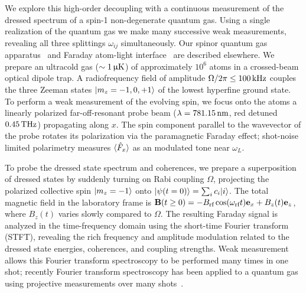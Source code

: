 \documentclass[aps,prl,reprint,superscriptaddress,floatfix]{revtex4-1}
\begin{document}
We explore this high-order decoupling with a continuous measurement of the dressed spectrum of a spin-1 non-degenerate quantum gas.
Using a single realization of the quantum gas we make many successive weak measurements, revealing all three splittings $\omega_{ij}$ simultaneously.
Our spinor quantum gas apparatus~\cite{wood_magnetic_2015} and Faraday atom-light interface~\cite{jasperse_magic-wavelength_2017} are described elsewhere.
We prepare an ultracold gas ($\sim \unit[1]{\upmu K}$) of approximately $10^6$ \Rb atoms in a crossed-beam optical dipole trap.
A radiofrequency field of amplitude $\Omega/2\pi \leq \unit[100]{kHz}$ couples the three Zeeman states $\vert m_z=-1,0,+1 \rangle $ of the lowest hyperfine ground state.
To perform a weak measurement of the evolving spin, we focus onto the atoms a linearly polarized far-off-resonant probe beam ($\lambda=\unit[781.15]{nm}$, red detuned $\unit[0.45]{THz}$) propagating along $x$.
The spin component parallel to the wavevector of the probe rotates its polarization via the paramagnetic Faraday effect; shot-noise limited polarimetry measures $\langle \hat{F}_x \rangle$ as an modulated tone near $\omega_L$.

To probe the dressed state spectrum and coherences, we prepare a superposition of dressed states by suddenly turning on Rabi coupling $\Omega$, projecting the polarized collective spin $\vert m_z=-1 \rangle $ onto $\vert \psi(t=0) \rangle  = \sum_i c_i \vert i \rangle $.
The total magnetic field in the laboratory frame is $\mathbf{B}(t \geq 0) = -B_{\text{rf}} \cos (\omega_{\text{rf}} t) \mathbf{e}_x + B_z(t) \mathbf{e}_z$, where $B_z(t)$ varies slowly compared to $\Omega$.
The resulting Faraday signal is analyzed in the time-frequency domain using the short-time Fourier transform (STFT), revealing the rich frequency and amplitude modulation related to the dressed state energies, coherences, and coupling strengths.
Weak measurement allows this Fourier transform spectroscopy to be performed many times in one shot; recently Fourier transform spectroscopy has been applied to a quantum gas using projective measurements over many shots~\cite{valdes-curiel_fourier_2017}.
\end{document}
